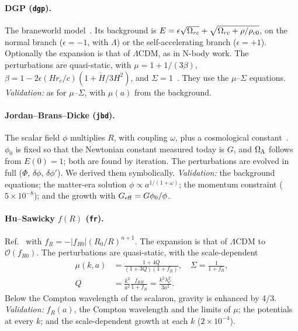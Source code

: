 \paragraph*{DGP (\texttt{dgp}).} The braneworld model~\cite{Dvali2000}. Its background is
$E=\epsilon\sqrt{\Omega_{rc}}+\sqrt{\Omega_{rc}+\rho/\rho_{c0}}$, on the normal branch ($\epsilon=-1$, with $\Lambda$) or
the self-accelerating branch ($\epsilon=+1$). Optionally the expansion is that of $\Lambda$CDM, as in N-body work.
The perturbations are quasi-static, with $\mu=1+1/(3\beta)$,
$\beta=1-2\epsilon(Hr_c/c)(1+\dot H/3H^2)$, and $\Sigma=1$~\cite{Koyama2006}. They use the $\mu$--$\Sigma$
equations. \emph{Validation:} as for $\mu$--$\Sigma$, with $\mu(a)$ from the background.

\paragraph*{Jordan--Brans--Dicke (\texttt{jbd}).} The scalar field $\phi$ multiplies $R$, with coupling $\omega$,
plus a cosmological constant~\cite{BransDicke1961}. $\phi_0$ is fixed so that the Newtonian constant measured
today is $G$, and $\Omega_\Lambda$ follows from $E(0)=1$; both are found by iteration. The perturbations are evolved in
full ($\Phi$, $\delta\phi$, $\delta\phi'$). We derived them symbolically. \emph{Validation:} the background
equations; the matter-era solution $\phi\propto a^{1/(1+\omega)}$; the momentum constraint ($5\times10^{-8}$);
and the growth with $G_{\rm eff}=G\phi_0/\phi$.

\paragraph*{Hu--Sawicky $f(R)$ (\texttt{fr}).} Ref.~\cite{HuSawicki2007} with $f_R=-|f_{R0}|(R_0/R)^{n+1}$. The
expansion is that of $\Lambda$CDM to $\mathcal O(f_{R0})$. The perturbations are quasi-static, with the
scale-dependent
\begin{align}
\mu(k,a)&=\frac{1+4Q}{(1+3Q)(1+f_R)},\quad \Sigma=\frac{1}{1+f_R},\nonumber\\
Q&=\frac{k^2}{a^2}\frac{f_{RR}}{1+f_R}=\frac{k^2\lambda_C^2}{3a^2}.
\end{align}
Below the Compton wavelength of the scalaron, gravity is enhanced by 4/3. \emph{Validation:} $f_R(a)$, the Compton
wavelength and the limits of $\mu$; the potentials at every $k$; and the scale-dependent growth at each $k$
($2\times10^{-4}$).


